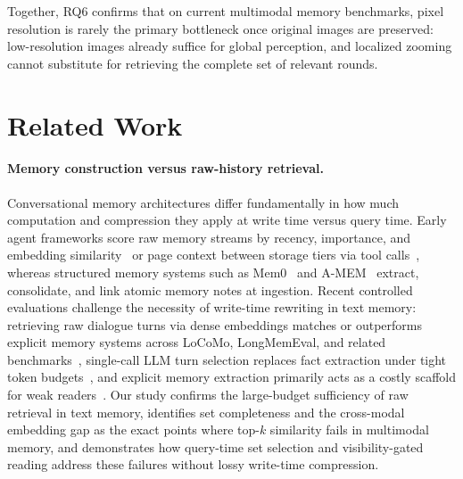 \documentclass[10pt]{article}
\begin{document}
Together, RQ6 confirms that on current multimodal memory benchmarks, pixel resolution is rarely the primary bottleneck once original images are preserved: low-resolution images already suffice for global perception, and localized zooming cannot substitute for retrieving the complete set of relevant rounds.

\section{Related Work}
\label{sec:related}

\paragraph{Memory construction versus raw-history retrieval.} Conversational memory architectures differ fundamentally in how much computation and compression they apply at write time versus query time. Early agent frameworks score raw memory streams by recency, importance, and embedding similarity~\citep{park2023generative} or page context between storage tiers via tool calls~\citep{packer2023memgpt}, whereas structured memory systems such as Mem0~\citep{chhikara2025mem0} and A-MEM~\citep{xu2025amem} extract, consolidate, and link atomic memory notes at ingestion. Recent controlled evaluations challenge the necessity of write-time rewriting in text memory: retrieving raw dialogue turns via dense embeddings matches or outperforms explicit memory systems across LoCoMo, LongMemEval, and related benchmarks~\citep{bao2026rawrag,zhou2026explicit}, single-call LLM turn selection replaces fact extraction under tight token budgets~\citep{sharma2026selection}, and explicit memory extraction primarily acts as a costly scaffold for weak readers~\citep{peng2026memorytax}. Our study confirms the large-budget sufficiency of raw retrieval in text memory, identifies set completeness and the cross-modal embedding gap as the exact points where top-$k$ similarity fails in multimodal memory, and demonstrates how query-time set selection and visibility-gated reading address these failures without lossy write-time compression.
\end{document}
